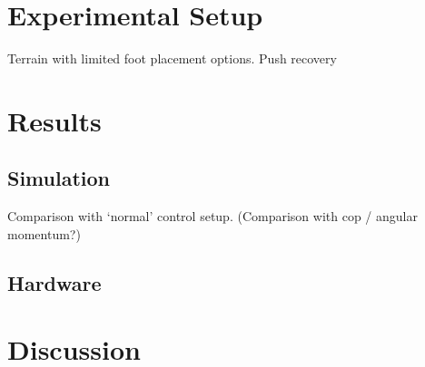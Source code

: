 \section{Experimental Setup}
Terrain with limited foot placement options. Push recovery

\section{Results}
\subsection{Simulation}
Comparison with `normal' control setup. (Comparison with cop / angular momentum?)
\subsection{Hardware}

\section{Discussion}
